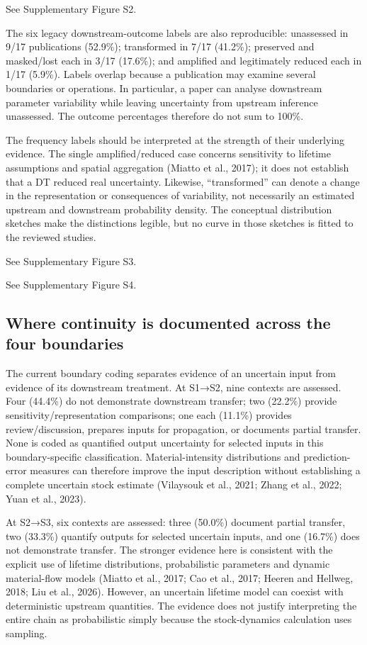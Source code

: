 See Supplementary Figure S2.

The six legacy downstream-outcome labels are also reproducible: unassessed in 9/17 publications (52.9\%); transformed in 7/17 (41.2\%); preserved and masked/lost each in 3/17 (17.6\%); and amplified and legitimately reduced each in 1/17 (5.9\%). Labels overlap because a publication may examine several boundaries or operations. In particular, a paper can analyse downstream parameter variability while leaving uncertainty from upstream inference unassessed. The outcome percentages therefore do not sum to 100\%.

The frequency labels should be interpreted at the strength of their underlying evidence. The single amplified/reduced case concerns sensitivity to lifetime assumptions and spatial aggregation (Miatto et al., 2017); it does not establish that a DT reduced real uncertainty. Likewise, “transformed” can denote a change in the representation or consequences of variability, not necessarily an estimated upstream and downstream probability density. The conceptual distribution sketches make the distinctions legible, but no curve in those sketches is fitted to the reviewed studies.

See Supplementary Figure S3.

See Supplementary Figure S4.


\subsection{Where continuity is documented across the four boundaries}
The current boundary coding separates evidence of an uncertain input from evidence of its downstream treatment. At S1→S2, nine contexts are assessed. Four (44.4\%) do not demonstrate downstream transfer; two (22.2\%) provide sensitivity/representation comparisons; one each (11.1\%) provides review/discussion, prepares inputs for propagation, or documents partial transfer. None is coded as quantified output uncertainty for selected inputs in this boundary-specific classification. Material-intensity distributions and prediction-error measures can therefore improve the input description without establishing a complete uncertain stock estimate (Vilaysouk et al., 2021; Zhang et al., 2022; Yuan et al., 2023).

At S2→S3, six contexts are assessed: three (50.0\%) document partial transfer, two (33.3\%) quantify outputs for selected uncertain inputs, and one (16.7\%) does not demonstrate transfer. The stronger evidence here is consistent with the explicit use of lifetime distributions, probabilistic parameters and dynamic material-flow models (Miatto et al., 2017; Cao et al., 2017; Heeren and Hellweg, 2018; Liu et al., 2026). However, an uncertain lifetime model can coexist with deterministic upstream quantities. The evidence does not justify interpreting the entire chain as probabilistic simply because the stock-dynamics calculation uses sampling.

